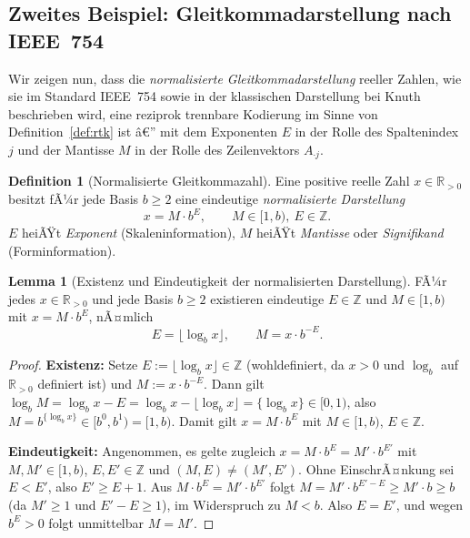 ﻿\documentclass[a4paper,12pt]{article}
\theoremstyle{definition}
\newtheorem{definition}{Definition}
\newtheorem{lemma}{Lemma}
\begin{document}
\subsection{Zweites Beispiel: Gleitkommadarstellung nach IEEE~754}
\label{subsec:ieee754}

Wir zeigen nun, dass die \emph{normalisierte Gleitkommadarstellung} reeller
Zahlen, wie sie im Standard IEEE~754 \cite{ieee754} sowie in der klassischen
Darstellung bei Knuth \cite{knuth1997} beschrieben wird, eine reziprok
trennbare Kodierung im Sinne von Definition~\ref{def:rtk} ist â€” mit dem
Exponenten $E$ in der Rolle des Spaltenindex $j$ und der Mantisse $M$ in der
Rolle des Zeilenvektors $A_{\cdot j}$.

\begin{definition}[Normalisierte Gleitkommazahl]
\label{def:floatdarstellung}
	Eine positive reelle Zahl $x\in\mathbb{R}_{>0}$ besitzt fÃ¼r jede Basis
	$b\geq2$ eine eindeutige \emph{normalisierte Darstellung}
	\[
		x = M \cdot b^{E}, \qquad M\in[1,b),\ E\in\mathbb{Z}.
	\]
	$E$ heiÃŸt \emph{Exponent} (Skaleninformation), $M$ heiÃŸt
	\emph{Mantisse} oder \emph{Signifikand} (Forminformation).
\end{definition}

\begin{lemma}[Existenz und Eindeutigkeit der normalisierten Darstellung]
\label{lem:floatexistenz}
	FÃ¼r jedes $x\in\mathbb{R}_{>0}$ und jede Basis $b\geq2$ existieren
	eindeutige $E\in\mathbb{Z}$ und $M\in[1,b)$ mit $x=M\cdot b^E$, nÃ¤mlich
	\[
		E = \lfloor \log_b x \rfloor, \qquad M = x\cdot b^{-E}.
	\]
\end{lemma}

\begin{proof}
	\textbf{Existenz:} Setze $E:=\lfloor\log_b x\rfloor\in\mathbb{Z}$ (wohldefiniert,
	da $x>0$ und $\log_b$ auf $\mathbb{R}_{>0}$ definiert ist) und
	$M:=x\cdot b^{-E}$. Dann gilt
	$\log_b M = \log_b x - E = \log_b x - \lfloor\log_b x\rfloor = \{\log_b x\}\in[0,1)$,
	also $M = b^{\{\log_b x\}}\in[b^0,b^1)=[1,b)$. Damit gilt $x=M\cdot b^E$
	mit $M\in[1,b)$, $E\in\mathbb{Z}$.

	\textbf{Eindeutigkeit:} Angenommen, es gelte zugleich
	$x=M\cdot b^E=M'\cdot b^{E'}$ mit $M,M'\in[1,b)$, $E,E'\in\mathbb{Z}$
	und $(M,E)\neq(M',E')$. Ohne EinschrÃ¤nkung sei $E<E'$, also $E'\geq E+1$.
	Aus $M\cdot b^E=M'\cdot b^{E'}$ folgt $M = M'\cdot b^{E'-E}\geq M'\cdot b\geq b$
	(da $M'\geq1$ und $E'-E\geq1$), im Widerspruch zu $M<b$. Also $E=E'$, und
	wegen $b^E>0$ folgt unmittelbar $M=M'$. \qedhere
\end{proof}
\end{document}
